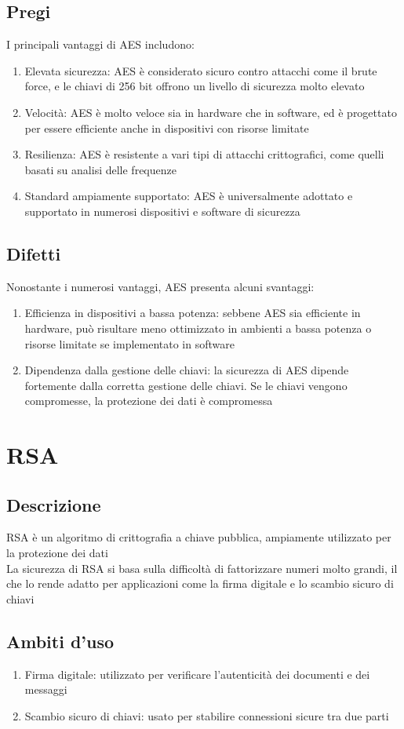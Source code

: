 \documentclass[10pt,oneside,a4paper]{article}
\begin{document}
\subsection{Pregi}
I principali vantaggi di AES includono:
\begin{enumerate}
\item Elevata sicurezza: AES è considerato sicuro contro attacchi come il brute force, e le chiavi di 256 bit offrono un livello di sicurezza molto elevato
\item Velocità: AES è molto veloce sia in hardware che in software, ed è progettato per essere efficiente anche in dispositivi con risorse limitate
\item Resilienza: AES è resistente a vari tipi di attacchi crittografici, come quelli basati su analisi delle frequenze
\item Standard ampiamente supportato: AES è universalmente adottato e supportato in numerosi dispositivi e software di sicurezza
\end{enumerate}
\subsection{Difetti}
Nonostante i numerosi vantaggi, AES presenta alcuni svantaggi:
\begin{enumerate}
\item Efficienza in dispositivi a bassa potenza: sebbene AES sia efficiente in hardware, può risultare meno ottimizzato in ambienti a bassa potenza o risorse limitate se implementato in software
\item Dipendenza dalla gestione delle chiavi: la sicurezza di AES dipende fortemente dalla corretta gestione delle chiavi. Se le chiavi vengono compromesse, la protezione dei dati è compromessa
\end{enumerate}
\section{RSA}
\subsection{Descrizione}
RSA è un algoritmo di crittografia a chiave pubblica, ampiamente utilizzato per la protezione dei dati\\
La sicurezza di RSA si basa sulla difficoltà di fattorizzare numeri molto grandi, il che lo rende adatto per applicazioni come la firma digitale e lo scambio sicuro di chiavi
\subsection{Ambiti d'uso}
\begin{enumerate}
\item Firma digitale: utilizzato per verificare l'autenticità dei documenti e dei messaggi
\item Scambio sicuro di chiavi: usato per stabilire connessioni sicure tra due parti
\end{enumerate}
\end{document}

